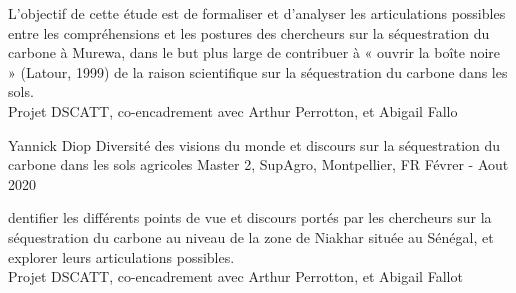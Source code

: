 \begin{cventries}
{\begin{cvitems}
            L'objectif de cette étude est de formaliser et d'analyser les articulations possibles entre les compréhensions et les postures des chercheurs sur la séquestration du carbone à Murewa, dans le but plus large de contribuer à « ouvrir la boîte noire » (Latour, 1999) de la raison scientifique sur la séquestration du carbone dans les sols.\\
            Projet DSCATT, co-encadrement avec Arthur Perrotton, et Abigail Fallo
        \end{cvitems}
        }
    \cventry
        {Yannick Diop} %
        {Diversité des visions du monde et discours sur la séquestration du carbone dans les sols agricoles} %
        {Master 2, SupAgro, Montpellier, FR} %
        {Févrer - Aout 2020} %
        {
        \begin{cvitems} %
            dentifier les différents points de vue et discours portés par les chercheurs sur la séquestration du carbone au niveau de la zone de Niakhar située au Sénégal, et explorer leurs articulations possibles.\\
            Projet DSCATT, co-encadrement avec Arthur Perrotton, et Abigail Fallot
        \end{cvitems}
        }
  

 
\end{cventries}
